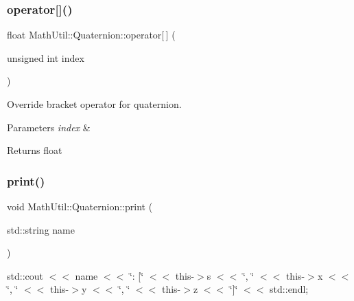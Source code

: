 \subsubsection{\texorpdfstring{operator[]()}{operator[]()}}
{\footnotesize\ttfamily float Math\+Util\+::\+Quaternion\+::operator\mbox{[}$\,$\mbox{]} (\begin{DoxyParamCaption}\item[{unsigned int}]{index }\end{DoxyParamCaption})\hspace{0.3cm}{\ttfamily [inline]}}



Override bracket operator for quaternion. 


\begin{DoxyParams}{Parameters}
{\em index} & \\
\hline
\end{DoxyParams}
\begin{DoxyReturn}{Returns}
float 
\end{DoxyReturn}
\mbox{\label{structMathUtil_1_1Quaternion_abd27342d40655826b293ccfc382601d5}} 
\subsubsection{\texorpdfstring{print()}{print()}}
{\footnotesize\ttfamily void Math\+Util\+::\+Quaternion\+::print (\begin{DoxyParamCaption}\item[{std\+::string}]{name }\end{DoxyParamCaption})\hspace{0.3cm}{\ttfamily [inline]}}

std\+::cout $<$$<$ name $<$$<$ \char`\"{}\+: \mbox{[}\char`\"{} $<$$<$ this-\/$>$s $<$$<$ \char`\"{}, \char`\"{} $<$$<$ this-\/$>$x $<$$<$ \char`\"{}, \char`\"{} $<$$<$ this-\/$>$y $<$$<$ \char`\"{}, \char`\"{} $<$$<$ this-\/$>$z $<$$<$ \char`\"{}\mbox{]}\char`\"{} $<$$<$ std\+::endl; \mbox{\label{structMathUtil_1_1Quaternion_a63ef2f087b43c15a16f685d2a58aa25e}} 

